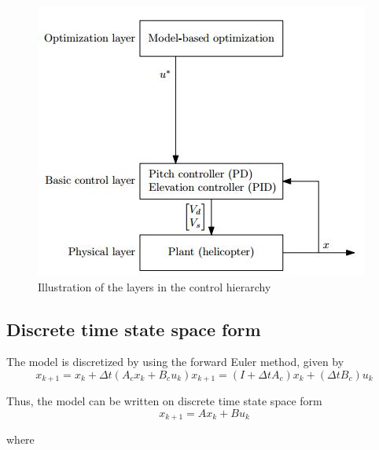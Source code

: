 \begin{figure}[H]
\includegraphics{figures/openLoopFlowChart}
\centering
\caption{Illustration of the layers in the control hierarchy}\label{fig:controlhierch}
\end{figure}

\subsection{Discrete time state space form}
The model is discretized by using the forward Euler method, given by
\begin{subequations}
\begin{equation}
{x_{k + 1}} = {x_k} + \Delta t({A_c}{x_k} + {B_c}{u_k})
\end{equation}
\begin{equation}
{x_{k + 1}} = (I + \Delta t{A_c}){x_k} + (\Delta t{B_c}){u_k}
\end{equation}
\label{eq:forwardeuler}
\end{subequations}

Thus, the model can be written on discrete time state space form
\begin{equation}
{x_{k + 1}} = A{x_k} + B{u_k}
\end{equation}

where 

